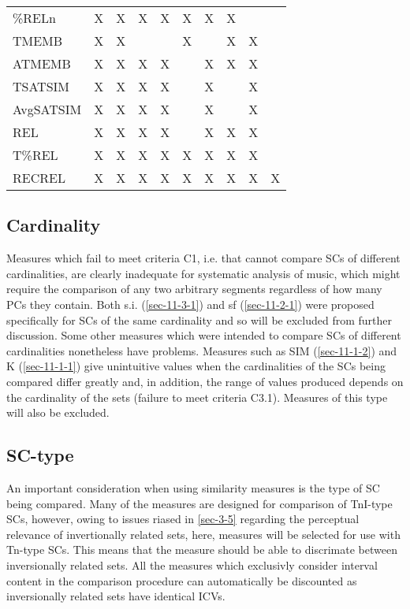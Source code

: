 \documentclass{article}
\begin{document}
\begin{table}[htb]
\begin{center}
\begin{tabular}{llllllllll}
 \%RELn      &  X   &  X   &  X     &  X     &  X     &  X     &  X   &      &      \\
 TMEMB       &  X   &  X   &        &        &  X     &        &  X   &  X   &      \\
 ATMEMB      &  X   &  X   &  X     &  X     &        &  X     &  X   &  X   &      \\
 TSATSIM     &  X   &  X   &  X     &  X     &        &  X     &      &  X   &      \\
 AvgSATSIM   &  X   &  X   &  X     &  X     &        &  X     &      &  X   &      \\
 REL         &  X   &  X   &  X     &  X     &        &  X     &  X   &  X   &      \\
 T\%REL      &  X   &  X   &  X     &  X     &  X     &  X     &  X   &  X   &      \\
 RECREL      &  X   &  X   &  X     &  X     &  X     &  X     &  X   &  X   &  X   \\
\hline
\end{tabular}
\end{center}
\end{table}
\subsection{Cardinality}
\label{sec-6-2}

Measures which fail to meet criteria C1, i.e. that cannot compare SCs
of different cardinalities, are clearly inadequate for systematic
analysis of music, which might require the comparison of any two
arbitrary segments regardless of how many PCs they contain. Both
s.i. (\ref{sec-11-3-1}) and sf (\ref{sec-11-2-1}) were proposed specifically for SCs of the same
cardinality and so will be excluded from further discussion. Some
other measures which were intended to compare SCs of different
cardinalities nonetheless have problems. Measures such as SIM (\ref{sec-11-1-2})
and K (\ref{sec-11-1-1}) give unintuitive values when the cardinalities of the SCs
being compared differ greatly and, in addition, the range of values
produced depends on the cardinality of the sets (failure to meet
criteria C3.1). Measures of this type will also be excluded.
\subsection{SC-type}
\label{sec-6-3}

An important consideration when using similarity measures is the type
of SC being compared. Many of the measures are designed for comparison
of TnI-type SCs, however, owing to issues riased in \ref{sec-3-5} regarding the perceptual relevance of invertionally related
sets, here, measures will be selected for use with Tn-type SCs. This
means that the measure should be able to discrimate between
inversionally related sets. All the measures which exclusivly consider
interval content in the comparison procedure can automatically be
discounted as inversionally related sets have identical ICVs.
\end{document}
